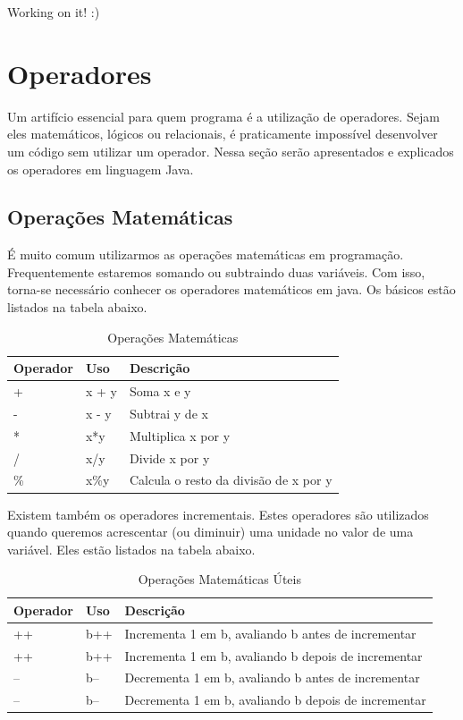 \documentclass[
]{book}
\begin{document}
Working on it! :)

\hypertarget{operadores}{%
\chapter{Operadores}\label{operadores}}

Um artifício essencial para quem programa é a utilização de operadores. Sejam eles matemáticos, lógicos ou relacionais, é praticamente impossível desenvolver um código sem utilizar um operador. Nessa seção serão apresentados e explicados os operadores em linguagem Java.

\hypertarget{operauxe7uxf5es-matemuxe1ticas}{%
\section{Operações Matemáticas}\label{operauxe7uxf5es-matemuxe1ticas}}

É muito comum utilizarmos as operações matemáticas em programação. Frequentemente estaremos somando ou subtraindo duas variáveis. Com isso, torna-se necessário conhecer os operadores matemáticos em java. Os básicos estão listados na tabela abaixo.

\begin{table}

\caption{\label{tab:unnamed-chunk-4}Operações Matemáticas}
\centering
\begin{tabular}[t]{l|l|l}
\hline
Operador & Uso & Descrição\\
\hline
+ & x + y & Soma x e y\\
\hline
- & x - y & Subtrai y de x\\
\hline
* & x*y & Multiplica x por y\\
\hline
/ & x/y & Divide x por y\\
\hline
\% & x\%y & Calcula o resto da divisão de x por y\\
\hline
\end{tabular}
\end{table}

Existem também os operadores incrementais. Estes operadores são utilizados quando queremos acrescentar (ou diminuir) uma unidade no valor de uma variável. Eles estão listados na tabela abaixo.

\begin{table}

\caption{\label{tab:unnamed-chunk-5}Operações Matemáticas Úteis}
\centering
\begin{tabular}[t]{l|l|l}
\hline
Operador & Uso & Descrição\\
\hline
++ & b++ & Incrementa 1 em b, avaliando b antes de incrementar\\
\hline
++ & b++ & Incrementa 1 em b, avaliando b depois de incrementar\\
\hline
-- & b-- & Decrementa 1 em b, avaliando b antes de incrementar\\
\hline
-- & b-- & Decrementa 1 em b, avaliando b depois de incrementar\\
\hline
\end{tabular}
\end{table}
\end{document}
